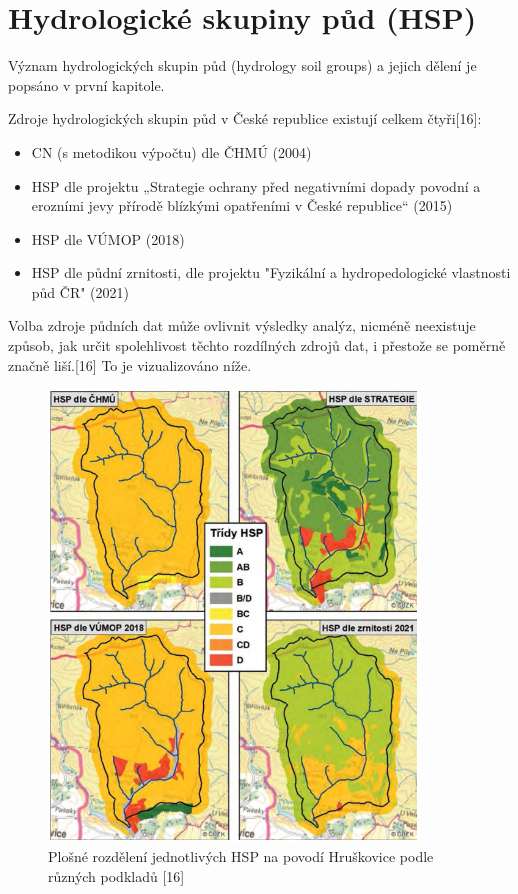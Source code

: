 \documentclass[a4paper,oneside,12pt]{book}
\begin{document}
\section{Hydrologické skupiny půd (HSP)} \label{hsp}
Význam hydrologických skupin půd (hydrology soil groups) a jejich dělení je popsáno v první kapitole. 

Zdroje hydrologických skupin půd v České republice existují celkem čtyři[16]:
\begin{itemize}
\item CN (s metodikou výpočtu) dle ČHMÚ (2004)
\item HSP dle projektu „Strategie ochrany před negativními dopady povodní a erozními jevy přírodě blízkými opatřeními v České republice“ (2015)
\item HSP dle VÚMOP (2018) 
\item HSP dle půdní zrnitosti, dle projektu "Fyzikální a hydropedologické vlastnosti půd ČR" (2021)
\end{itemize}
Volba zdroje půdních dat může ovlivnit výsledky analýz, nicméně neexistuje způsob, jak určit spolehlivost těchto rozdílných zdrojů dat, i přestože se poměrně značně liší.[16] To je vizualizováno níže.

\begin{figure}[ht] \label{obr4}
\centering
\includegraphics[height=12cm]{pictures/HSPmapa.png}
\caption{Plošné rozdělení jednotlivých HSP na povodí Hruškovice podle různých podkladů [16]}
\label{fig:hsp}
\end{figure}
\end{document}
